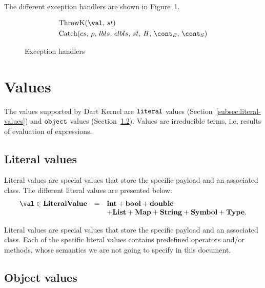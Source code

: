 \documentclass[a4paper,oneside]{article}
\begin{document}
The different exception handlers are shown in Figure~\ref{figure:handlers}.
\newcommand{\ThrowH}[2]{\mathrm{ThrowK}({#1},\,{#2})}
\newcommand{\CatchH}[1]{\mathrm{Catch}({#1},\,\env,\,\lbls,\,\clbls,\,\strace,\,\handler,\,\econt,\,\scont)}

\begin{figure}[Htp]
  \begin{eqfigure}
  \begin{align}
    &\ThrowH{\val}{\strace} \label{handle:throw} \\
    &\CatchH{cs} \label{handle:catch}
  \end{align}
  \caption{Exception handlers}
  \label{figure:handlers}
  \end{eqfigure}
\end{figure}


\section{Values}
\label{sec:values}

The values supported by Dart Kernel are $\tt{literal}$ values (Section~\ref{subsec:literal-values}) and $\tt{object}$ values (Section~\ref{subsec:object-values}).
Values are irreducible terms, i.e, results of evaluation of expressions.


\subsection{Literal values}
\label{subsubsec:literal-values}

Literal values are special values that store the specific payload and an associated class.
The different literal values are presented below:
\[
  \begin{array}{lcl}
    \val \in \dlitval &=& \mathbf{int} + \mathbf{bool} + \mathbf{double}\\
    && + \mathbf{List} + \mathbf{Map} + \mathbf{String} + \mathbf{Symbol} + \mathbf{Type}.
  \end{array}
\]

Literal values are special values that store the specific payload and an associated class.
Each of the specific literal values contains predefined operators and/or methods, whose semantics we are not going to specify in this document.


\subsection{Object values}
\label{subsec:object-values}
\end{document}
